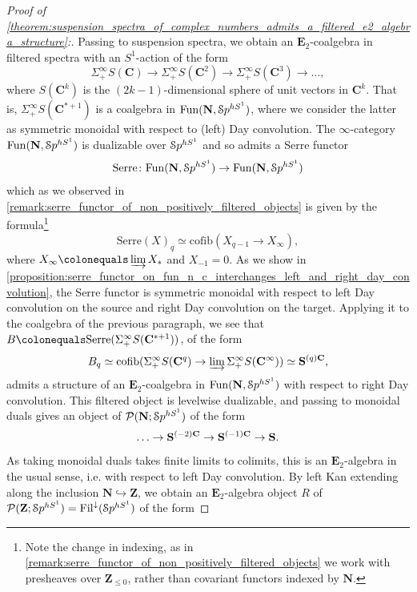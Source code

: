 \documentclass[oneside,a4paper]{amsart}
\begin{document}
\begin{proof}[{Proof of \cref{theorem:suspension_spectra_of_complex_numbers_admits_a_filtered_e2_algebra_structure}:}]
Passing to suspension spectra, we obtain an $\mathbf{E}_{2}$-coalgebra in filtered spectra with an $S^{1}$-action of the form 
\[
\Sigma^{\infty}_{+} S(\mathbf{C}) \rightarrow \Sigma^{\infty}_{+} S(\mathbf{C}^{2}) \rightarrow \Sigma^{\infty}_{+} S(\mathbf{C}^{3}) \rightarrow \ldots,   
\]
where $S(\mathbf{C}^{k})$ is the $(2k-1)$-dimensional sphere of unit vectors in $\mathbf{C}^{k}$. That is, $\Sigma^{\infty}_{+} S(\mathbf{C}^{\ast+1})$ is a coalgebra in $\mathrm{Fun}(\mathbf{N}, \EuScript{S}p^{hS^{1}})$, where we consider the latter as symmetric monoidal with respect to (left) Day convolution. The $\infty$-category $\mathrm{Fun}(\mathbf{N}, \EuScript{S}p^{hS^{1}})$ is dualizable over $\EuScript{S}p^{hS^{1}}$ and so admits a Serre functor 
\[
\mathrm{Serre} \colon \mathrm{Fun}(\mathbf{N}, \EuScript{S}p^{hS^{1}}) \rightarrow \mathrm{Fun}(\mathbf{N}, \EuScript{S}p^{hS^{1}})
\]
which as we observed in \cref{remark:serre_functor_of_non_positively_filtered_objects} is given by the formula\footnote{Note the change in indexing, as in \cref{remark:serre_functor_of_non_positively_filtered_objects} we work with presheaves over $\mathbf{Z}_{\leq 0}$, rather than covariant functors indexed by $\mathbf{N}$.} 
\[
\mathrm{Serre}(X)_{q} \simeq \mathrm{cofib} (X_{q-1} \rightarrow X_{\infty}), 
\]
where $X_{\infty} \colonequals \varinjlim X_{\ast}$ and $X_{-1} = 0$. As we show in \cref{proposition:serre_functor_on_fun_n_c_interchanges_left_and_right_day_convolution}, the Serre functor is symmetric monoidal with respect to left Day convolution on the source and right Day convolution on the target. Applying it to the coalgebra of the previous paragraph, we see that $B \colonequals \mathrm{Serre}(\Sigma^{\infty}_{+} S(\mathbf{C}^{\ast+1}))$, of the form  
\[
B_{q} \simeq \mathrm{cofib}(\Sigma^{\infty}_{+}S(\mathbf{C}^{q}) \rightarrow \varinjlim \Sigma^{\infty}_{+}S(\mathbf{C}^{\infty})) \simeq \mathbf{S}^{(q)\mathbf{C}},
\]
admits a structure of an $\mathbf{E}_{2}$-coalgebra in $\mathrm{Fun}(\mathbf{N}, \EuScript{S}p^{hS^{1}})$ with respect to right Day convolution. This filtered object is levelwise dualizable, and passing to monoidal duals gives an object of $\mathcal{P}(\mathbf{N}; \EuScript{S}p^{hS^{1}})$ of the form 
\[
\ldots \rightarrow \mathbf{S}^{(-2)\mathbf{C}} \rightarrow \mathbf{S}^{(-1)\mathbf{C}} \rightarrow \mathbf{S}.
\]
As taking monoidal duals takes finite limits to colimits, this is an $\mathbf{E}_{2}$-algebra in the usual sense, i.e. with respect to left Day convolution. By left Kan extending along the inclusion $\mathbf{N} \hookrightarrow \mathbf{Z}$, we obtain an $\mathbf{E}_{2}$-algebra object $R$ of $\mathcal{P}(\mathbf{Z}; \EuScript{S}p^{hS^{1}}) = \operatorname{Fil}^{\downarrow}(\EuScript{S}p^{hS^{1}})$ of the form 

\end{proof}
\end{document}
